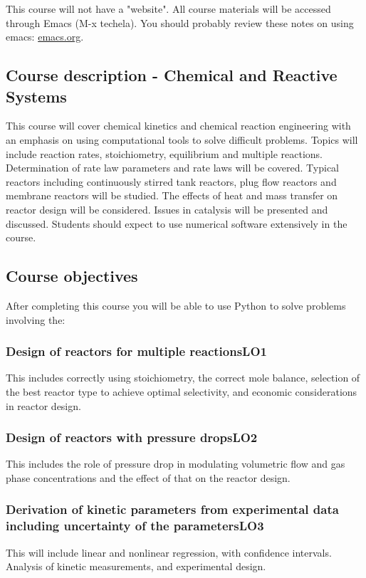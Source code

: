 \documentclass[11pt]{article}
\begin{document}
This course will not have a "website". All course materials will be accessed through Emacs (M-x techela). You should probably review these notes on using emacs: \url{emacs.org}.

\subsection{Course description - Chemical and Reactive Systems}
\label{sec:orgheadline1}

This course will cover chemical kinetics and chemical reaction engineering with an emphasis on using computational tools to solve difficult problems. Topics will include reaction rates, stoichiometry, equilibrium and multiple reactions. Determination of rate law parameters and rate laws will be covered. Typical reactors including continuously stirred tank reactors, plug flow reactors and membrane reactors will be studied. The effects of heat and mass transfer on reactor design will be considered. Issues in catalysis will be presented and discussed. Students should expect to use numerical software extensively in the course.

\subsection{Course objectives}
\label{sec:orgheadline8}

After completing this course you will be able to use Python to solve problems involving the:

\subsubsection{Design of reactors for multiple reactions\hfill{}\textsc{LO1}}
\label{sec:orgheadline2}
This includes correctly using stoichiometry, the correct mole balance, selection of the best reactor type to achieve optimal selectivity, and economic considerations in reactor design.

\subsubsection{Design of reactors with pressure drops\hfill{}\textsc{LO2}}
\label{sec:orgheadline3}
This includes the role of pressure drop in modulating volumetric flow and gas phase concentrations and the effect of that on the reactor design.

\subsubsection{Derivation of kinetic parameters from experimental data including uncertainty of the parameters\hfill{}\textsc{LO3}}
\label{sec:orgheadline4}
This will include linear and nonlinear regression, with confidence intervals. Analysis of kinetic measurements, and experimental design.
\end{document}
